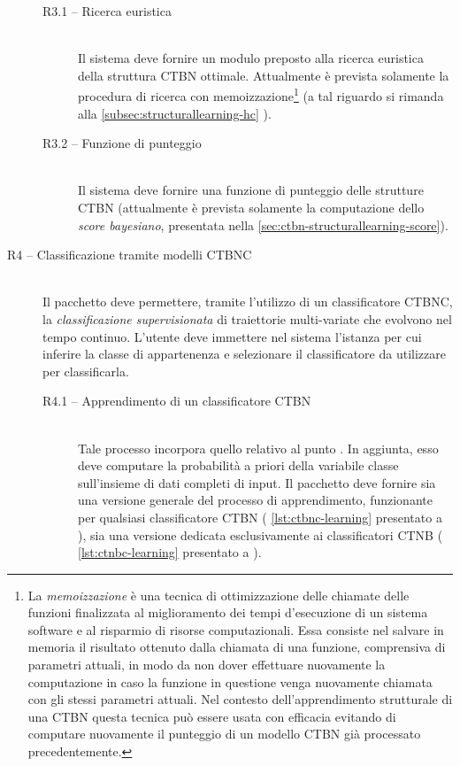 \begin{description}
		\begin{description}
			\item[R3.1 -- Ricerca euristica] \hfill \\
			Il sistema deve fornire un modulo preposto alla ricerca euristica della struttura \acs{CTBN} ottimale. Attualmente è prevista solamente la procedura di ricerca \emph{\hc{}} con memoizzazione\footnote{La \emph{memoizzazione} è una tecnica di ottimizzazione delle chiamate delle funzioni finalizzata al miglioramento dei tempi d'esecuzione di un sistema software e al risparmio di risorse computazionali. Essa consiste nel salvare in memoria il risultato ottenuto dalla chiamata di una funzione, comprensiva di parametri attuali, in modo da non dover effettuare nuovamente la computazione in caso la funzione in questione venga nuovamente chiamata con gli stessi parametri attuali. Nel contesto dell'apprendimento strutturale di una \acs{CTBN} questa tecnica può essere usata con efficacia evitando di computare nuovamente il punteggio di un modello \acs{CTBN} già processato precedentemente.} (a tal riguardo si rimanda alla \autoref{subsec:structurallearning-hc} ).
			\item[R3.2 -- Funzione di punteggio] \hfill \\
			Il sistema deve fornire una funzione di punteggio delle strutture \acs{CTBN} (attualmente è prevista solamente la computazione dello \emph{score bayesiano}, presentata nella \vref{sec:ctbn-structurallearning-score}).
		\end{description}
	\item[R4 -- Classificazione tramite modelli CTBNC] \hfill \\
	Il pacchetto deve permettere, tramite l'utilizzo di un classificatore \acs{CTBNC}, la \emph{classificazione supervisionata} di traiettorie multi-variate che evolvono nel tempo continuo. L'utente deve immettere nel sistema l'istanza per cui inferire la classe di appartenenza e selezionare il classificatore da utilizzare per classificarla.
		\begin{description}
		\item[R4.1 -- Apprendimento di un classificatore CTBN] \hfill \\
		Tale processo incorpora quello relativo al punto {\bfseries{}}. In aggiunta, esso deve computare la probabilità a priori della variabile classe sull'insieme di dati completi di input. Il pacchetto deve fornire sia una versione generale del processo di apprendimento, funzionante per qualsiasi classificatore \acs{CTBN} (\ie{} \autoref{lst:ctbnc-learning} presentato a ), sia una versione dedicata esclusivamente ai classificatori \acs{CTNB} (\ie{} \autoref{lst:ctnbc-learning} presentato a ).

\end{description}
\end{description}
